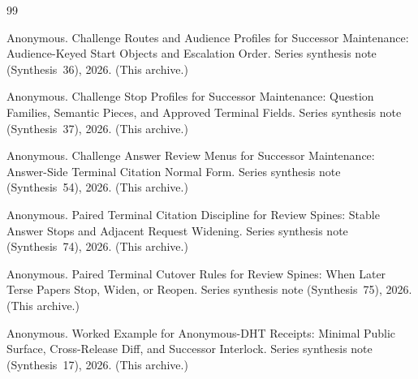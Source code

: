 \documentclass[11pt]{article}
\begin{document}
\begin{thebibliography}{99}\small

Anonymous.
\newblock Challenge Routes and Audience Profiles for Successor Maintenance: Audience-Keyed Start Objects and Escalation Order.
\newblock Series synthesis note (Synthesis~36), 2026. (This archive.)

Anonymous.
\newblock Challenge Stop Profiles for Successor Maintenance: Question Families, Semantic Pieces, and Approved Terminal Fields.
\newblock Series synthesis note (Synthesis~37), 2026. (This archive.)

Anonymous.
\newblock Challenge Answer Review Menus for Successor Maintenance: Answer-Side Terminal Citation Normal Form.
\newblock Series synthesis note (Synthesis~54), 2026. (This archive.)

Anonymous.
\newblock Paired Terminal Citation Discipline for Review Spines: Stable Answer Stops and Adjacent Request Widening.
\newblock Series synthesis note (Synthesis~74), 2026. (This archive.)

Anonymous.
\newblock Paired Terminal Cutover Rules for Review Spines: When Later Terse Papers Stop, Widen, or Reopen.
\newblock Series synthesis note (Synthesis~75), 2026. (This archive.)

Anonymous.
\newblock Worked Example for Anonymous-DHT Receipts: Minimal Public Surface, Cross-Release Diff, and Successor Interlock.
\newblock Series synthesis note (Synthesis~17), 2026. (This archive.)

\end{thebibliography}
\end{document}
